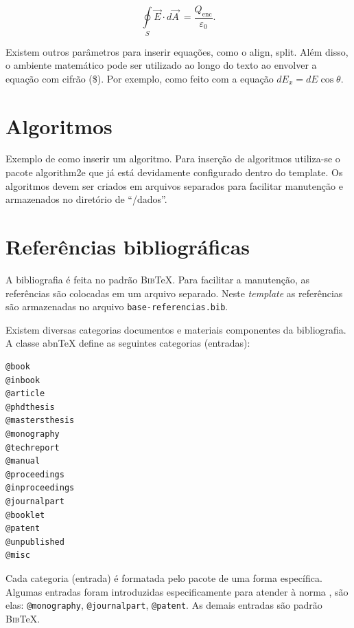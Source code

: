 \begin{equation*}
    \oint \limits_S \Vec{E}\cdot d \Vec{A}\ =
    \frac{Q_{\mathrm{enc}}}{\varepsilon_0}
    .
\end{equation*}

Existem outros parâmetros para inserir equações, como o {\ttfamily align},  {\ttfamily split}.
Além disso, o ambiente matemático pode ser utilizado ao longo do texto ao envolver a equação com cifrão (\$). Por exemplo, como feito com a equação $ dE_x = dE \cos\theta $.

\section{Algoritmos}
\label{sec:algoritmos}

Exemplo de como inserir um algoritmo. Para inserção de algoritmos utiliza-se o pacote {\ttfamily algorithm2e} que já está devidamente configurado dentro do template.
Os algoritmos devem ser criados em arquivos separados para facilitar manutenção e armazenados no diretório de ``/dados''. \\


\section{Referências bibliográficas}
\label{sec:referenciasBibliograficas}

A bibliografia é feita no padrão \textsc{Bib}\TeX{}. Para facilitar a manutenção, as referências são colocadas em um arquivo separado. Neste \textit{template} as referências são armazenadas no arquivo \verb|base-referencias.bib|.

Existem diversas categorias documentos e materiais componentes da bibliografia. A classe abn\TeX{} define as seguintes categorias (entradas):

\begin{verbatim}
@book
@inbook
@article
@phdthesis
@mastersthesis
@monography
@techreport
@manual
@proceedings
@inproceedings
@journalpart
@booklet
@patent
@unpublished
@misc
\end{verbatim}

Cada categoria (entrada) é formatada pelo pacote  de uma forma específica. Algumas entradas foram introduzidas especificamente para atender à norma , são elas: \verb|@monography|, \verb|@journalpart|, \verb|@patent|. As demais entradas são padrão \textsc{Bib}\TeX{}.
